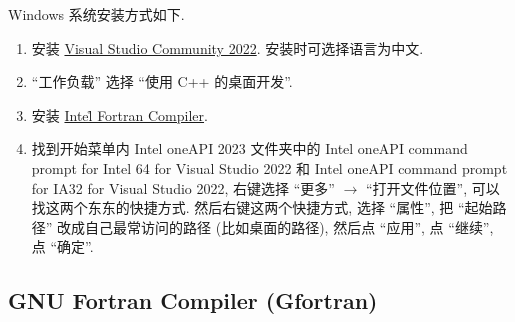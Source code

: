Windows 系统安装方式如下.
\begin{enumerate}
    \item 安装 \href{https://visualstudio.microsoft.com/zh-hans/thank-you-downloading-visual-studio/?sku=Community&channel=Release&version=VS2022&source=VSLandingPage&cid=2030&passive=false}
    {Visual Studio Community 2022}. 安装时可选择语言为中文.
    \item ``工作负载'' 选择 ``使用 C++ 的桌面开发''.
    \item 安装 \href{https://registrationcenter-download.intel.com/akdlm/IRC_NAS/7feb5647-59dd-420d-8753-345d31e177dc/w_fortran-compiler_p_2024.2.0.424.exe}{Intel\r{} Fortran Compiler}.
    \item 找到开始菜单内 Intel oneAPI 2023 文件夹中的 Intel oneAPI command prompt for Intel 64 for Visual Studio 2022 和 Intel oneAPI command prompt for IA32 for Visual Studio 2022, 右键选择 ``更多'' $\rightarrow$ ``打开文件位置'', 可以找这两个东东的快捷方式. 然后右键这两个快捷方式, 选择 ``属性'', 把 ``起始路径'' 改成自己最常访问的路径 (比如桌面的路径), 然后点 ``应用'', 点 ``继续'', 点 ``确定''.\label{to_desktop}
\end{enumerate}

\subsection[GNU Fortran\\Compiler]{GNU Fortran Compiler (Gfortran)}

